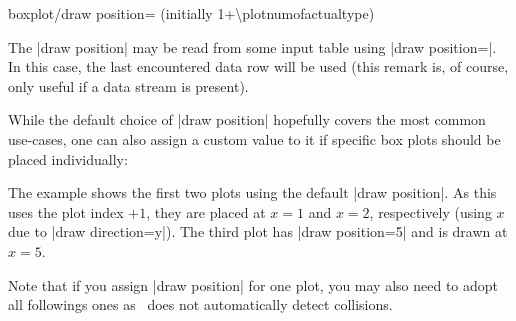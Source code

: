 \begin{pgfplotskey}{boxplot/draw position= (initially 1+\textbackslash plotnumofactualtype)}
\begin{codeexample}[]
\end{codeexample}

\noindent
	The |draw position| may be read from some input table using |draw position=\thisrow|. In this case, the last encountered data row will be used (this remark is, of course, only useful if a data stream is present).


	While the default choice of |draw position| hopefully covers the most common use-cases, one can also assign a custom value to it if specific box plots should be placed individually:
\begin{codeexample}[]
\end{codeexample}
	\noindent The example shows the first two plots using the default |draw position|. As this uses the plot index $+1$, they are placed at $x=1$ and $x=2$, respectively (using $x$ due to |draw direction=y|). The third plot has |draw position=5| and is drawn at $x=5$. 

	Note that if you assign |draw position| for one plot, you may also need to adopt all followings ones as \PGFPlots\ does not automatically detect collisions.
\end{pgfplotskey}

